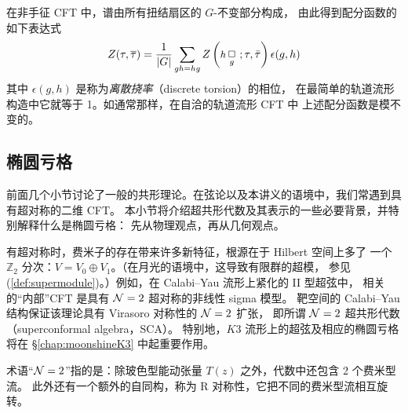 \documentclass[11pt,a4paper,fontset=windows]{ctexart}
\numberwithin{equation}{section}
\newcommand{\Z}{\mathbb{Z}}
\def\t{\tau}
\newcommand{\eq}[1]{(\ref{#1})}
\begin{document}

在非手征 CFT 中，谱由所有扭结扇区的 $G$-不变部分构成，
由此得到配分函数的如下表达式
\begin{equation}\label{eqn:orb_PF}
Z(\tau,\overline{\tau})=\frac{1}{|G|}\sum_{gh=hg}Z\left(\mbox{\fontsize{9}{10}\selectfont $h\,$}\underset{g}{\Box}~;\t,\bar{\t}\right)\epsilon(g,h)
\end{equation}
其中 $\epsilon(g,h)$ 是称为\emph{离散挠率}（discrete torsion）的相位，
在最简单的轨道流形构造中它就等于 1。如通常那样，在自洽的轨道流形 CFT 中
上述配分函数是模不变的。


\subsection{椭圆亏格}
\label{sec:EG}

前面几个小节讨论了一般的共形理论。在弦论以及本讲义的语境中，我们常遇到具有超对称的二维 CFT。
本小节将介绍超共形代数及其表示的一些必要背景，并特别解释什么是椭圆亏格：
先从物理观点，再从几何观点。

有超对称时，费米子的存在带来许多新特征，根源在于 Hilbert 空间上多了
一个 $\Z_2$ 分次：$V= V_0 \oplus V_1$。（在月光的语境中，这导致有限群的超模，
参见 \eq{def:supermodule}。）例如，在 Calabi–Yau 流形上紧化的 II 型超弦中，
相关的“内部”CFT 是具有 ${\cal N}=2$ 超对称的非线性 sigma 模型。
靶空间的 Calabi–Yau 结构保证该理论具有 Virasoro 对称性的 ${\cal N}=2$ 扩张，
即所谓 ${\cal N}=2$ 超共形代数（superconformal algebra，SCA）。
特别地，$K3$ 流形上的超弦及相应的椭圆亏格将在 \S\ref{chap:moonshineK3} 中起重要作用。

术语“${\cal N}=2$”指的是：除玻色型能动张量 $T(z)$ 之外，代数中还包含 2 个费米型流。
此外还有一个额外的自同构，称为 R 对称性，它把不同的费米型流相互旋转。
\end{document}
